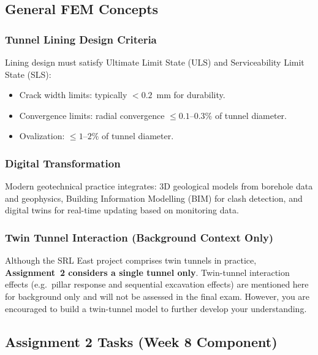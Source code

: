 \documentclass[a4paper,12pt]{article}
\begin{document}
\subsection{General FEM Concepts}

\subsubsection{Tunnel Lining Design Criteria}
Lining design must satisfy Ultimate Limit State (ULS) and Serviceability Limit State (SLS):
\begin{itemize}
    \item Crack width limits: typically $< 0.2$~mm for durability.
    \item Convergence limits: radial convergence $\leq 0.1$--$0.3\%$ of tunnel diameter.
    \item Ovalization: $\leq 1$--$2\%$ of tunnel diameter.
\end{itemize}

\subsubsection{Digital Transformation}
Modern geotechnical practice integrates: 3D geological models from borehole data and geophysics, Building Information Modelling (BIM) for clash detection, and digital twins for real-time updating based on monitoring data.

\subsubsection{Twin Tunnel Interaction (Background Context Only)}
Although the SRL East project comprises twin tunnels in practice, \textbf{Assignment~2 considers a single tunnel only}. Twin-tunnel interaction effects (e.g.\ pillar response and sequential excavation effects) are mentioned here for background only and will not be assessed in the final exam. However, you are encouraged to build a twin-tunnel model to further develop your understanding.

\subsection{Assignment 2 Tasks (Week 8 Component)}
\end{document}
